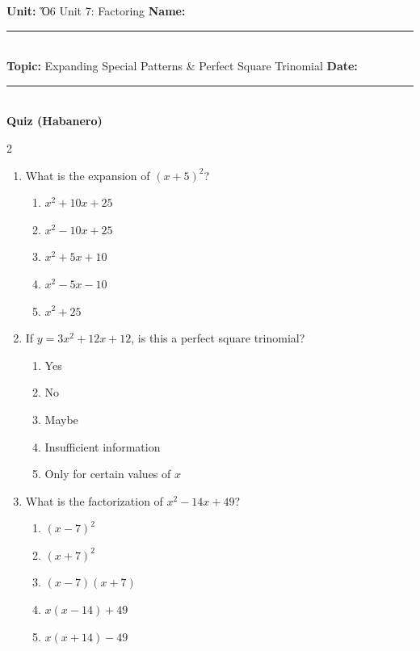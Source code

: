 \documentclass[10pt]{article}
\begin{document}
\enlargethispage{2.5cm}

\begin{tcolorbox}[colback=mainblue!5, colframe=mainblue, sharp corners, boxrule=0.5pt]
    \small \textbf{Unit:} Ὅ6 Unit 7: Factoring \hfill \textbf{Name:} \rule{3cm}{0.4pt} \\
    \small \textbf{Topic:} Expanding Special Patterns & Perfect Square Trinomial \hfill \textbf{Date:} \rule{2cm}{0.4pt} \\
    \centering \textbf{\large Quiz (Habanero)}
\end{tcolorbox}

\vspace{0.2cm}

\begin{multicols}{2}
\begin{enumerate}[label=\textbf{Q\arabic*.}, leftmargin=*, itemsep=6pt, parsep=0pt]

  \item \small What is the expansion of $(x + 5)^2$?
  \begin{enumerate}[label=(\Alph*), leftmargin=0.6cm, nosep, itemsep=2pt]
    \item $x^2 + 10x + 25$
    \item $x^2 - 10x + 25$
    \item $x^2 + 5x + 10$
    \item $x^2 - 5x - 10$
    \item $x^2 + 25$
  \end{enumerate}

  \item \small If $y = 3x^2 + 12x + 12$, is this a perfect square trinomial?
  \begin{enumerate}[label=(\Alph*), leftmargin=0.6cm, nosep, itemsep=2pt]
    \item Yes
    \item No
    \item Maybe
    \item Insufficient information
    \item Only for certain values of $x$
  \end{enumerate}

  \item \small What is the factorization of $x^2 - 14x + 49$?
  \begin{enumerate}[label=(\Alph*), leftmargin=0.6cm, nosep, itemsep=2pt]
    \item $(x - 7)^2$
    \item $(x + 7)^2$
    \item $(x - 7)(x + 7)$
    \item $x(x - 14) + 49$
    \item $x(x + 14) - 49$
  \end{enumerate}


\end{enumerate}
\end{multicols}
\end{document}
